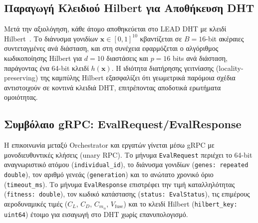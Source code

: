 \subsection{Παραγωγή Κλειδιού Hilbert για Αποθήκευση DHT}
\label{subsec:impl_hilbert_key}

Μετά την αξιολόγηση, κάθε άτομο αποθηκεύεται στο LEAD DHT με κλειδί Hilbert~\cite{skilling2004hilbert}. Το διάνυσμα γονιδίων $\mathbf{x} \in [0,1]^{10}$ κβαντίζεται σε $B = 16$-bit ακέραιες συντεταγμένες ανά διάσταση, και στη συνέχεια εφαρμόζεται ο αλγόριθμος κωδικοποίησης Hilbert για $d = 10$ διαστάσεις και $p = 16$ bits ανά διάσταση, παράγοντας ένα 64-bit κλειδί $h(\mathbf{x})$. Η ιδιότητα διατήρησης γειτνίασης (locality-preserving) της καμπύλης Hilbert εξασφαλίζει ότι γεωμετρικά παρόμοια σχέδια αντιστοιχούν σε κοντινά κλειδιά DHT, επιτρέποντας αποδοτικά ερωτήματα ομοιότητας.

\subsection{Συμβόλαιο gRPC: EvalRequest/EvalResponse}
\label{subsec:impl_grpc_worker}

Η επικοινωνία μεταξύ Orchestrator και εργατών γίνεται μέσω gRPC με μονοδιευθυντικές κλήσεις (unary RPC). Το μήνυμα \texttt{EvalRequest} περιέχει το 64-bit αναγνωριστικό ατόμου (\texttt{individual\_id}), το διάνυσμα γονιδίων (\texttt{genes: repeated double}), τον αριθμό γενεάς (\texttt{generation}) και το ανώτατο χρονικό όριο (\texttt{timeout\_ms}). Το μήνυμα \texttt{EvalResponse} επιστρέφει την τιμή καταλληλότητας (\texttt{fitness: double}), τον κωδικό κατάστασης (\texttt{status: EvalStatus}), τις επιμέρους αεροδυναμικές τιμές ($C_L$, $C_D$, $C_{m_\alpha}$, $V_{\text{fuse}}$) και το κλειδί Hilbert (\texttt{hilbert\_key: uint64}) έτοιμο για εισαγωγή στο DHT χωρίς επανυπολογισμό.


